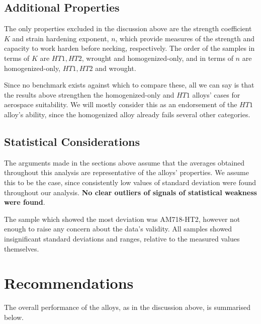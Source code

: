\documentclass{article}
\begin{document}
\subsection{Additional Properties}
The only properties excluded in the discussion above are the strength coefficient $K$ and strain hardening exponent, $n$, which provide measures of the strength and capacity to work harden before necking, respectively. The order of the samples in terms of $K$ are $HT1, HT2$, wrought and homogenized-only, and in terms of $n$ are homogenized-only, $HT1, HT2$ and wrought.

Since no benchmark exists against which to compare these, all we can say is that the results above strengthen the homogenized-only and $HT1$ alloys' cases for aerospace suitability. We will mostly consider this as an endorsement of the $HT1$ alloy's ability, since the homogenized alloy already fails several other categories.


\subsection{Statistical Considerations}
The arguments made in the sections above assume that the averages obtained throughout this analysis are representative of the alloys' properties. We assume this to be the case, since consistently low values of standard deviation were found throughout our analysis. \textbf{No clear outliers of signals of statistical weakness were found}.

The sample which showed the most deviation was AM718-HT2, however not enough to raise any concern about the data's validity. All samples showed insignificant standard deviations and ranges, relative to the measured values themselves.

\section{Recommendations}

The overall performance of the alloys, as in the discussion above, is summarised below.
\end{document}
